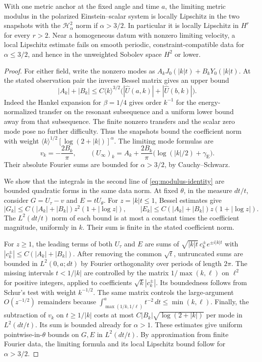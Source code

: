 \begin{theorem}
\label{th:metric-modulus}
With one metric anchor at the fixed angle and time $a$,
the limiting metric modulus in the polarized
Einstein--scalar system is locally Lipschitz in the
two snapshots with the $\mathcal H^2_\alpha$ norm if
$\alpha>3/2$. In particular it is locally Lipschitz
in $H^r$ for every $r>2$.
Near a homogeneous datum with nonzero limiting
velocity, a local Lipschitz estimate fails on smooth
periodic, constraint-compatible data for
$\alpha\le3/2$, and hence in the unweighted
Sobolev space $H^2$ or lower.
\end{theorem}

\begin{proof}
For either field, write the nonzero modes as
$A_kJ_0(|k|t)+B_kY_0(|k|t)$.
At the stated observation pair the inverse Bessel
matrix gives an upper bound
\[
 |A_k|+|B_k|\le C\langle k\rangle^{3/2}
                 \big(|\widehat U(a,k)|+|\widehat U(b,k)|\big).
\]
Indeed the Hankel expansion for $\beta=1/4$
gives order $k^{-1}$ for the energy-normalized
transfer on the resonant subsequence and a uniform
lower bound away from that subsequence. The finite
nonzero transfers and the scalar zero mode pose
no further difficulty. Thus the snapshots bound
the coefficient norm with weight
$\langle k\rangle^{1/2}[\log(2+|k|)]^\alpha$.
The limiting mode formulas are
\[
 v_k=-\frac{2B_k}{\pi},\qquad
 (U_\infty)_k=A_k+
      \frac{2B_k}{\pi}\big(\log(|k|/2)+\gamma_{\mathrm E}\big).
\]
Their absolute Fourier sums are bounded for
$\alpha>3/2$, by Cauchy--Schwarz.

We show that the integrals in the second line of
\eqref{eq:modulus-identity} are bounded quadratic
forms in the same data norm. At fixed $\theta$,
in the measure $dt/t$, consider
$G=U_\tau-v$ and $E=tU_\theta$.
For $z=|k|t\le1$, Bessel estimates give
\[
 |G_k|\le C(|A_k|+|B_k|)z^2(1+|\log z|),\qquad
 |E_k|\le C(|A_k|+|B_k|)z(1+|\log z|).
\]
The $L^2(dt/t)$ norm of each bound is at most a
constant times the coefficient magnitude,
uniformly in $k$. Their sum is finite in the stated
coefficient norm.

For $z\ge1$, the leading terms of both
$U_\tau$ and $E$ are sums of
$\sqrt{|k|t}\,c_k^\pm e^{\pm i|k|t}$
with $|c_k^\pm|\le C(|A_k|+|B_k|)$.
After removing the common $\sqrt t$, untruncated
sums are bounded in $L^2(0,a;dt)$ by Fourier
orthogonality over periods of length $2\pi$.
The missing intervals $t<1/|k|$ are controlled by
the matrix $1/\max(k,\ell)$ on $\ell^2$ for positive
integers, applied to coefficients $\sqrt{k}|c_k^\pm|$.
Its boundedness follows from Schur's test with
weight $k^{-1/2}$. The same matrix controls
the large-argument $O(z^{-1/2})$ remainders
because $\int_{\max(1/k,1/\ell)}^a t^{-2}\,dt
\le\min(k,\ell)$. Finally, the subtraction of $v_k$
on $t\ge1/|k|$ costs at most
$C|B_k|\sqrt{\log(2+|k|)}$ per mode in $L^2(dt/t)$.
Its sum is bounded already for $\alpha>1$.
These estimates give uniform pointwise-in-$\theta$
bounds on $G,E$ in $L^2(dt/t)$.
By approximation from finite Fourier data,
the limiting formula and its local Lipschitz bound
follow for $\alpha>3/2$.


\end{proof}
